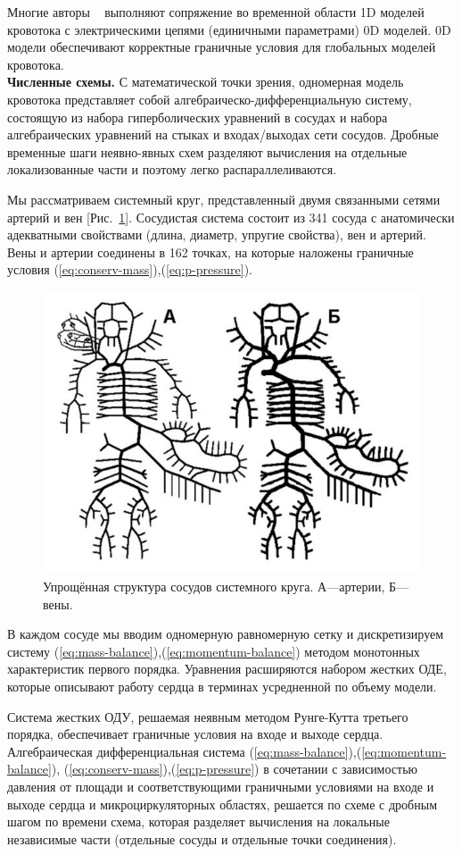 Многие авторы ~\cite{alastruey:2008} выполняют сопряжение во временной области 1D моделей кровотока с электрическими цепями (единичными параметрами) 0D моделей. 0D модели обеспечивают корректные граничные условия для глобальных моделей кровотока.
\\

{\bf Численные схемы.}
С математической точки зрения, одномерная модель кровотока представляет собой алгебраическо-дифференциальную систему, состоящую из набора гиперболических уравнений в сосудах и набора алгебраических уравнений на стыках и входах/выходах сети сосудов. Дробные временные шаги неявно-явных схем разделяют вычисления на отдельные локализованные части и поэтому легко распараллеливаются.

Мы рассматриваем системный круг, представленный двумя связанными сетями артерий и вен [Рис.~\ref{ss}]. Сосудистая система состоит из 341 сосуда с анатомически адекватными свойствами (длина, диаметр, упругие свойства), вен и артерий. Вены и артерии соединены в 162 точках, на которые наложены граничные условия (\ref{eq:conserv-mass}),(\ref{eq:p-pressure}). 

\begin{figure}[h]
\centering
\includegraphics[width=0.5\linewidth]{krug.png}
\caption{Упрощённая структура сосудов системного круга. А—артерии, Б—вены.}
\label{ss}
\end{figure}

В каждом сосуде мы вводим одномерную равномерную сетку и дискретизируем систему (\ref{eq:mass-balance}),(\ref{eq:momentum-balance}) методом монотонных характеристик первого порядка. Уравнения расширяются набором жестких ОДЕ, которые описывают работу сердца в терминах усредненной по объему модели.

Система жестких ОДУ, решаемая неявным методом Рунге-Кутта третьего порядка, обеспечивает граничные условия на входе и выходе сердца. Алгебраическая дифференциальная система (\ref{eq:mass-balance}),(\ref{eq:momentum-balance}), (\ref{eq:conserv-mass}),(\ref{eq:p-pressure}) в сочетании с зависимостью давления от площади и соответствующими граничными условиями на входе и выходе сердца и микроциркуляторных областях, решается по схеме с дробным шагом по времени схема, которая разделяет вычисления на локальные независимые части (отдельные сосуды и отдельные точки соединения).

